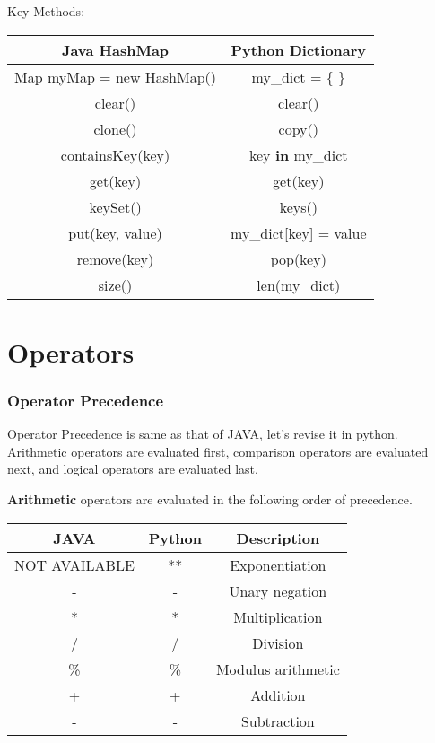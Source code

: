 \documentclass[a4paper,9pt]{extarticle}
\begin{document}
\begin{multicols*}{2}
Key Methods:
\begin{center}
 \begin{tabular}{||c | c||}
 \hline
 Java HashMap & Python Dictionary\\ [1ex]
 \hline\hline
 Map myMap = new HashMap() & my\_dict = \{ \}\\
 \hline
 clear() & clear()\\
 \hline
 clone() & copy()\\
 \hline
 containsKey(key) & key \textbf{in} my\_dict\\
 \hline
 get(key) & get(key)\\
 \hline
 keySet() & keys()\\
 \hline
 put(key, value) & my\_dict[key] = value\\
 \hline
 remove(key) & pop(key)\\
 \hline
 size() & len(my\_dict)\\
 \hline
\end{tabular}
\end{center}

\section{Operators}
\subsubsection{Operator Precedence}
Operator Precedence is same as that of JAVA, let's revise it in python. Arithmetic operators are evaluated first, comparison operators are evaluated next, and logical operators are evaluated last.

\textbf{Arithmetic} operators are evaluated in the following order of precedence.

\begin{center}
 \begin{tabular}{||c | c | c||}
 \hline
 \textbf{JAVA} & \textbf{Python} & \textbf{Description}\\ [1ex]
 \hline\hline
 NOT AVAILABLE & ** & Exponentiation\\
 \hline
 - & -  & Unary negation\\
 \hline
 * & * & Multiplication\\
 \hline
 / & / & Division\\
 \hline
 \% & \% & Modulus arithmetic\\
 \hline
 + & +  & Addition\\
 \hline
 - & - & Subtraction\\
 \hline
\end{tabular}
\end{center}


\end{multicols*}
\end{document}
